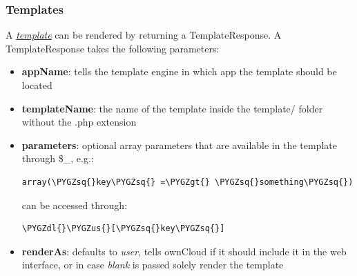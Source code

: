 \documentclass[letterpaper,10pt,english]{sphinxmanual}
\def\PYGZus{\char`\_}
\def\PYGZgt{\char`\>}
\def\PYGZdl{\char`\$}
\def\PYGZsq{\char`\'}
\renewcommand\PYGZsq{\textquotesingle}
\begin{document}
\subsubsection{Templates}
\label{app/controllers:templates}
A {\hyperref[app/templates::doc]{\emph{\emph{template}}}} can be rendered by returning a TemplateResponse. A TemplateResponse takes the following parameters:
\begin{itemize}
\item {} 
\textbf{appName}: tells the template engine in which app the template should be located

\item {} 
\textbf{templateName}: the name of the template inside the template/ folder without the .php extension

\item {} 
\textbf{parameters}: optional array parameters that are available in the template through \$\_, e.g.:

\begin{Verbatim}[commandchars=\\\{\}]
array(\PYGZsq{}key\PYGZsq{} =\PYGZgt{} \PYGZsq{}something\PYGZsq{})
\end{Verbatim}

can be accessed through:

\begin{Verbatim}[commandchars=\\\{\}]
\PYGZdl{}\PYGZus{}[\PYGZsq{}key\PYGZsq{}]
\end{Verbatim}

\item {} 
\textbf{renderAs}: defaults to \emph{user}, tells ownCloud if it should include it in the web interface, or in case \emph{blank} is passed solely render the template

\end{itemize}
\end{document}
